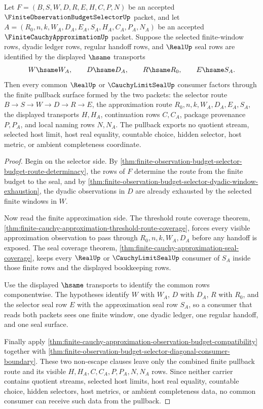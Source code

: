 \begin{theorem}
\label{thm:finite-observation-budget-selector-budget-approximation-pullback}
Let $F=(B,S,W,D,R,E,H,C,P,N)$ be an accepted $\FiniteObservationBudgetSelectorUp$ packet, and let $A=(R_0,n,k,W_A,D_A,E_A,S_A,H_A,C_A,P_A,N_A)$ be an accepted $\FiniteCauchyApproximationUp$ packet. Suppose the selected finite-window rows, dyadic ledger rows, regular handoff rows, and $\RealUp$ seal rows are identified by the displayed $\hsame$ transports
$$
W \hsame W_A,\qquad
D \hsame D_A,\qquad
R \hsame R_0,\qquad
E \hsame S_A.
$$
Then every common $\RealUp$ or $\CauchyLimitSealUp$ consumer factors through the finite pullback surface formed by the two packets: the selector route $B \to S \to W \to D \to R \to E$, the approximation route $R_0,n,k,W_A,D_A,E_A,S_A$, the displayed transports $H,H_A$, continuation rows $C,C_A$, package provenance $P,P_A$, and local naming rows $N,N_A$. The pullback exports no quotient stream, selected host limit, host real equality, countable choice, hidden selector, host metric, or ambient completeness coordinate.
\end{theorem}
\begin{proof}
Begin on the selector side. By \autoref{thm:finite-observation-budget-selector-budget-route-determinacy}, the rows of $F$ determine the route from the finite budget to the seal, and by \autoref{thm:finite-observation-budget-selector-dyadic-window-exhaustion}, the dyadic observations in $D$ are already exhausted by the selected finite windows in $W$.

Now read the finite approximation side. The threshold route coverage theorem, \autoref{thm:finite-cauchy-approximation-threshold-route-coverage}, forces every visible approximation observation to pass through $R_0,n,k,W_A,D_A$ before any handoff is exposed. The seal coverage theorem, \autoref{thm:finite-cauchy-approximation-seal-coverage}, keeps every $\RealUp$ or $\CauchyLimitSealUp$ consumer of $S_A$ inside those finite rows and the displayed bookkeeping rows.

Use the displayed $\hsame$ transports to identify the common rows componentwise. The hypotheses identify $W$ with $W_A$, $D$ with $D_A$, $R$ with $R_0$, and the selector seal row $E$ with the approximation seal row $S_A$, so a consumer that reads both packets sees one finite window, one dyadic ledger, one regular handoff, and one seal surface.

Finally apply \autoref{thm:finite-cauchy-approximation-observation-budget-compatibility} together with \autoref{thm:finite-observation-budget-selector-diagonal-consumer-boundary}. These two non-escape clauses leave only the combined finite pullback route and its visible $H,H_A,C,C_A,P,P_A,N,N_A$ rows. Since neither carrier contains quotient streams, selected host limits, host real equality, countable choice, hidden selectors, host metrics, or ambient completeness data, no common consumer can receive such data from the pullback.
\end{proof}

